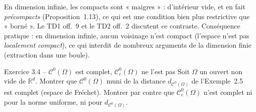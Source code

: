\documentclass[11pt,a4paper]{article}
\newcommand{\R}{\mathbb{R}}
\newcommand{\Cz}{\mathcal{C}^0}
\newcommand{\Cc}{\mathcal{C}^0_c}
\theoremstyle{definition}
\begin{document}
\begin{commentaire}
En dimension infinie, les compacts sont « maigres » : d'intérieur vide, et en fait \emph{précompacts} (Proposition~1.13), ce qui est une condition bien plus restrictive que « borné ». Le TD1 off.~9 et le TD2 off.~2 discutent ce contraste. Conséquence pratique : en dimension infinie, aucun voisinage n'est compact (l'espace n'est pas \emph{localement compact}), ce qui interdit de nombreux arguments de la dimension finie (extraction dans une boule).
\end{commentaire}

\begin{exo}{Exercice 3.4 -- $\Cz(\Omega)$ est complet, $\Cc(\Omega)$ ne l'est pas}
Soit $\Omega$ un ouvert non vide de $\R^d$. Montrer que $\Cz(\Omega)$ muni de la distance $d_{\Cz(\Omega)}$ de l'Exemple~2.5 est complet (espace de Fréchet). Montrer par contre que $\Cc(\Omega)$ n'est complet ni pour la norme uniforme, ni pour $d_{\Cz(\Omega)}$.
\end{exo}
\end{document}
